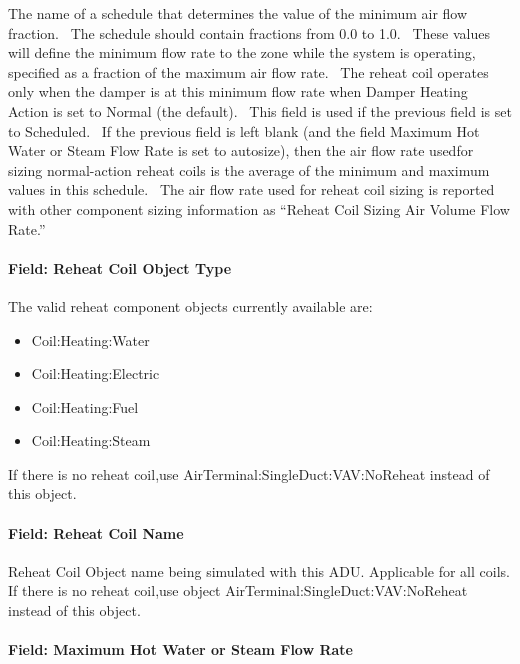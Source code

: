 The name of a schedule that determines the value of the minimum air flow fraction.~ The schedule should contain fractions from 0.0 to 1.0.~ These values will define the minimum flow rate to the zone while the system is operating, specified as a fraction of the maximum air flow rate.~ The reheat coil operates only when the damper is at this minimum flow rate when Damper Heating Action is set to Normal (the default).~ This field is used if the previous field is set to Scheduled.~ If the previous field is left blank (and the field Maximum Hot Water or Steam Flow Rate is set to autosize), then the air flow rate usedfor sizing normal-action reheat coils is the average of the minimum and maximum values in this schedule.~ The air flow rate used for reheat coil sizing is reported with other component sizing information as ``Reheat Coil Sizing Air Volume Flow Rate.''

\paragraph{Field: Reheat Coil Object Type}\label{field-reheat-coil-object-type-1}

The valid reheat component objects currently available are:

\begin{itemize}
\item
  Coil:Heating:Water
\item
  Coil:Heating:Electric
\item
  Coil:Heating:Fuel
\item
  Coil:Heating:Steam
\end{itemize}

If there is no reheat coil,use AirTerminal:SingleDuct:VAV:NoReheat instead of this object.

\paragraph{Field: Reheat Coil Name}\label{field-reheat-coil-name-1}

Reheat Coil Object name being simulated with this ADU. Applicable for all coils. If there is no reheat coil,use object AirTerminal:SingleDuct:VAV:NoReheat instead of this object.

\paragraph{Field: Maximum Hot Water or Steam Flow Rate}\label{field-maximum-hot-water-or-steam-flow-rate-1}

